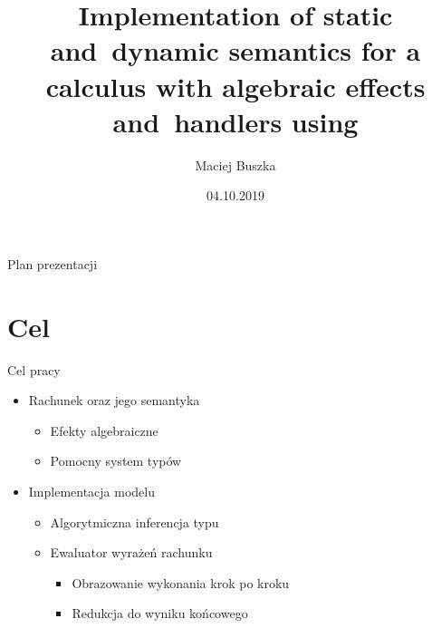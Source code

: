 \documentclass{beamer}
\title[A calculus with algebraic effects and~handlers]{Implementation of static and~dynamic semantics for a calculus with algebraic effects and~handlers using \Redex}
\author{Maciej Buszka}
\institute{Instytut Informatyki UWr}
\date{04.10.2019}
\begin{document}
\begin{frame}
  \titlepage
\end{frame}

\begin{frame}{Plan prezentacji}
  \tableofcontents
\end{frame}



\section{Cel}

\begin{frame}{Cel pracy}
  \begin{itemize}
    \item Rachunek oraz jego semantyka
    \begin{itemize}
      \item Efekty algebraiczne
      \item Pomocny system typów
    \end{itemize}
    \item Implementacja modelu
    \begin{itemize}
      \item Algorytmiczna inferencja typu
      \item Ewaluator wyrażeń rachunku
      \begin{itemize}
        \item Obrazowanie wykonania krok po kroku
        \item Redukcja do wyniku końcowego
      \end{itemize}
    \end{itemize}
  \end{itemize}
\end{frame}
\end{document}
